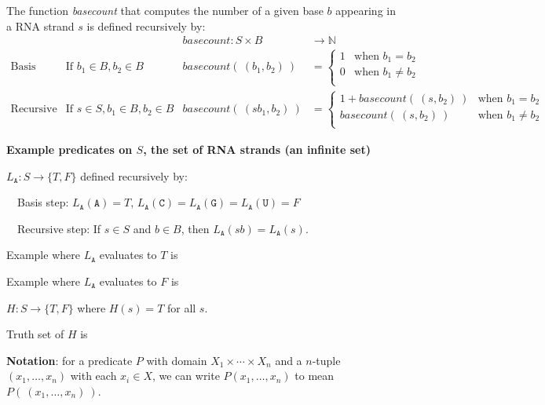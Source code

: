 \documentclass[12pt, oneside]{article}
\newcommand{\A}[0]{\texttt{A}}
\newcommand{\C}[0]{\texttt{C}}
\newcommand{\G}[0]{\texttt{G}}
\newcommand{\U}[0]{\texttt{U}}
\begin{document}
The function \textit{basecount} that computes the number of a given base 
$b$ appearing in a RNA strand $s$ is defined recursively by:
\[
\begin{array}{llll}
& & \textit{basecount} : S \times B & \to \mathbb{N} \\
\textrm{Basis Step:} &  \textrm{If } b_1 \in B, b_2 \in B & \textit{basecount}(~(b_1, b_2)~) & =
        \begin{cases}
            1 & \textrm{when } b_1 = b_2 \\
            0 & \textrm{when } b_1 \neq b_2 \\
        \end{cases} \\
\textrm{Recursive Step:} & \textrm{If } s \in S, b_1 \in B, b_2 \in B &\textit{basecount}(~(s b_1, b_2)~) & =
        \begin{cases}
            1 + \textit{basecount}(~(s, b_2)~) & \textrm{when } b_1 = b_2 \\
            \textit{basecount}(~(s, b_2)~) & \textrm{when } b_1 \neq b_2 \\
        \end{cases}
\end{array}
\] 

{\bf Example predicates on $S$, the set of RNA strands (an infinite set)}


$L_{\A}: S \to \{T, F\}$  defined recursively by: 

~~Basis step: $L_{\A}(\A) = T$, $L_{\A}(\C) = L_{\A}(\G) = L_{\A}(\U) = F$

~~Recursive step: If $s \in S$ and $b \in B$, then $L_{\A}(sb) = L_{\A}(s)$.

Example where $L_{\A}$ evaluates to $T$ is \underline{\phantom{$\A\C\G$~\hspace{1in}}}

\vfill

Example where $L_{\A}$ evaluates to $F$ is \underline{\phantom{$\U\A\C\U$\hspace{1in}}}

\vfill


$H: S \to \{T, F\}$ where $H(s) = T$ for all $s$.

Truth set of $H$ is \underline{}

\vfill
 \newpage


{\bf Notation}: for a predicate $P$ with domain $X_1 \times \cdots \times X_n$ and a 
$n$-tuple $(x_1, \ldots, x_n)$ 
with each $x_i \in X$, we 
can write $P(x_1, \ldots, x_n)$ to mean $P( ~(x_1, \ldots, x_n)~)$.
 \vfill
\end{document}
